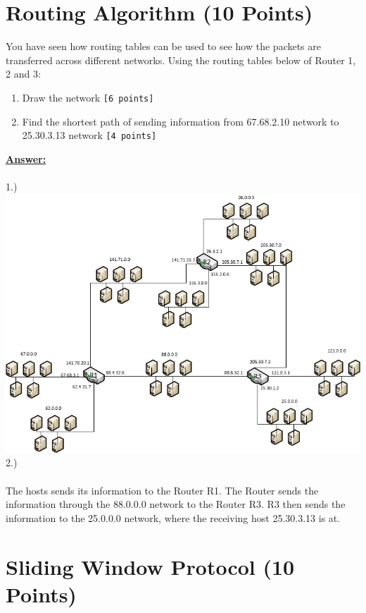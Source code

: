 \documentclass{scrartcl}
\begin{document}

\section{Routing Algorithm (10 Points)}
You have seen how routing tables can be used to see how the packets are transferred across different networks. Using the routing tables below of Router 1, 2 and 3:
\begin{enumerate}
	\item Draw the network \texttt{[6 points]}
	\item Find the shortest path of sending information from 67.68.2.10 network to 25.30.3.13 network \texttt{[4 points]}
\end{enumerate}

\textbf{\underline{Answer:}}\\
\\
1.)\\
\includegraphics[width=1\textwidth]{21.png}
2.)\\
\\
The hosts sends its information to the Router R1. The Router sends the information through the 88.0.0.0 network to the Router R3. R3 then sends the information to the 25.0.0.0 network, where the receiving host 25.30.3.13 is at.\\


\section{Sliding Window Protocol (10 Points)}
\end{document}
